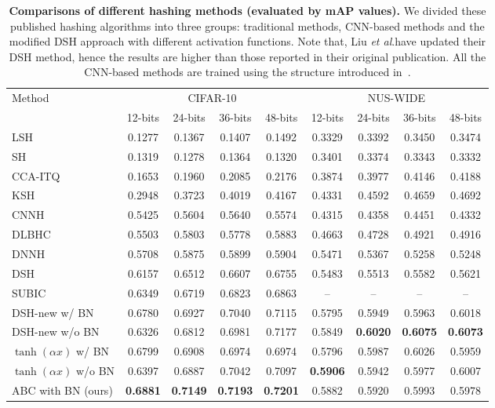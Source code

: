 \documentclass[runningheads]{llncs}
\newcommand{\etal}{\textit{et al}.}
\begin{document}
\begin{table*}[!t]
	\caption{\textbf{Comparisons of different hashing methods (evaluated by mAP values).} We divided these published hashing algorithms into three groups: traditional methods, CNN-based methods and the modified DSH approach with different activation functions. Note that, Liu \etal have updated their DSH method, hence the results are higher than those reported in their original publication. All the CNN-based methods are trained using the structure introduced in~\cite{Liu16CVPR_r12}.}
	\label{Table1} 
	\begin{center}
		\begin{tabular}{l||c|c|c|c||c|c|c|c}
			\hline
			\multirow{2}{*}{Method} & \multicolumn{4}{c||}{CIFAR-10} & \multicolumn{4}{c}{NUS-WIDE} \\
			\cline{2-9} & 12-bits & 24-bits & 36-bits & 48-bits & 12-bits & 24-bits & 36-bits & 48-bits \\
			\hline
			LSH~\cite{Gionis99VLDB_LSH} & 0.1277 & 0.1367 & 0.1407 & 0.1492 & 0.3329 & 0.3392 & 0.3450 & 0.3474 \\
			SH~\cite{Weiss14NIPS_r3} & 0.1319 & 0.1278 & 0.1364 & 0.1320 & 0.3401 & 0.3374 & 0.3343 & 0.3332 \\
			CCA-ITQ~\cite{Gong11CVPR_r1} & 0.1653 & 0.1960 & 0.2085 & 0.2176 & 0.3874 & 0.3977 & 0.4146 & 0.4188 \\
			KSH~\cite{Liu12CVPR_r6} & 0.2948 & 0.3723 & 0.4019 & 0.4167 & 0.4331 & 0.4592 & 0.4659 & 0.4692 \\
			\hline
			CNNH~\cite{Xia14AAAI_r11} & 0.5425 & 0.5604 & 0.5640 & 0.5574 & 0.4315 & 0.4358 & 0.4451 & 0.4332 \\
			DLBHC~\cite{Lin15CVPRW_r13} & 0.5503 & 0.5803 & 0.5778 & 0.5883 & 0.4663 & 0.4728 & 0.4921 & 0.4916 \\
			DNNH~\cite{Lai15CVPR_r16} & 0.5708 & 0.5875 & 0.5899 & 0.5904 & 0.5471 & 0.5367 & 0.5258 & 0.5248 \\
			DSH~\cite{Liu16CVPR_r12} & 0.6157 & 0.6512 & 0.6607 & 0.6755 & 0.5483 & 0.5513 & 0.5582 & 0.5621 \\
			SUBIC~\cite{SUBIC} & 0.6349 & 0.6719 & 0.6823 & 0.6863 & -- & -- & -- & -- \\
			\hline
			DSH-new w/ BN & 0.6780 & 0.6927 & 0.7040 & 0.7115 & 0.5795 & 0.5949 & 0.5963 & 0.6018 \\ 
			DSH-new w/o BN & 0.6326 & 0.6812 & 0.6981 & 0.7177 & 0.5849 & \textbf{0.6020} & \textbf{0.6075} & \textbf{0.6073} \\
			$\tanh(\alpha x)$ w/ BN & 0.6799 & 0.6908 & 0.6974 & 0.6974 & 0.5796 & 0.5987 & 0.6026 & 0.5959 \\
			$\tanh(\alpha x)$ w/o BN & 0.6397 & 0.6887 & 0.7042 & 0.7097 & \textbf{0.5906} & 0.5942 & 0.5977 & 0.6007 \\
			ABC with BN (ours) & \textbf{0.6881} & \textbf{0.7149} & \textbf{0.7193} & \textbf{0.7201} & 0.5882 & 0.5920 & 0.5993 & 0.5978 \\
			\hline
		\end{tabular}
	\end{center}
\end{table*}
\end{document}
